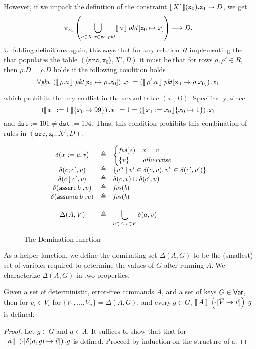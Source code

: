 However, if we unpack the definition of the constraint
$\llbracket\,X'\,\rrbracket(\texttt{x}_0).\texttt{x}_1 \to D$, we get
\[\pi_{\texttt{x}_1}\left(\bigcup_{a \in X, x \in
      \texttt{x}_0,\mathit{pkt}} \llbracket\,a\,\rrbracket\; pkt[\texttt{x}_0 \mapsto x]
  \right) \longrightarrow D.\] Unfolding definitions again, this says
that for any relation $R$ implementing the that populates the table
$(\langle\texttt{src},\texttt{x}_0\rangle, X', D)$ it must be that for
rows $\rho, \rho' \in R$, then $\rho.D = \rho.D$ holds if the
following condition holds
\[\forall \mathit{pkt}. \left(\llbracket\,\rho.a\,\rrbracket\; \mathit{pkt}[\texttt{x}_0 \mapsto
    \rho.x_0 ]\right).x_1 =
  \left(\llbracket\,\rho'.a\,\rrbracket\;\mathit{pkt}[\texttt{x}_0\mapsto \rho.x_0
    ]\right).x_1\]

which prohibits the key-conflict in the second table
$(\texttt{x}_1,D)$. Specifically, since
\[\left(\llbracket\,x_1:=1\,\rrbracket \{x_0 \mapsto 99\}\right).x_1 = 1 =
  \left(\llbracket\,x_1:=x_0\,\rrbracket \{x_0 \mapsto 1\}\right).x_1\] and
$\texttt{dst} := 101 \neq \texttt{dst} := 104$. Thus, this condition
prohibits this combination of rules in
$(\texttt{src}, \texttt{x}_0, X', D)$.

\begin{figure}[tpb]
  \[\begin{array}{c>{\triangleq}cl}
      \delta(x := e,v) && \begin{cases}
        \fvs(e) &x = v\\
        \{v\} & \textit{otherwise} \end{cases} \\
      \delta(c;c', v) && \left\{v'' \mid v' \in \delta(c, v), v'' \in \delta(c', v')\right\} \\
      \delta(c\angel c', v) && \delta (c, v) \cup \delta(c', v) \\
      \delta(\assert b, v) && \fvs(b) \\
      \delta(\assume b, v) && \fvs(b) \\\\
      \Delta(A, V) && \displaystyle\bigcup_{a\in A,v \in V}\delta(a,v)
    \end{array}\]
  \caption{The Domination function}
  \label{fig:delta }
\end{figure}

As a helper function, we define the dominating set $\Delta(A,G)$ to be
the (smallest) set of varibles required to determine the values of $G$
after running $A$. We characterize $\Delta(A,G)$ in two properties.

\begin{proposition}
  Given a set of deterministic, error-free commands $A$, and a set of
  keys $G \in \mathsf{Var}$, then for $v_i \in V_i$ for
  $\{V_1, \ldots, V_n\} = \Delta(A,G)$, and every $g \in G$,
  $\llbracket\,A\,\rrbracket~\left(\cdot[\vec V \mapsto \vec v]\right).g$ is defined.
\end{proposition}
\begin{proof}
  Let $g \in G$ and $a \in A$. It suffices to show that that for
  $\llbracket\,a\,\rrbracket~\left(\cdot[\delta(a,g) \mapsto \vec v]\right).g$ is
  defined. Proceed by induction on the structure of a.
\end{proof}
  

